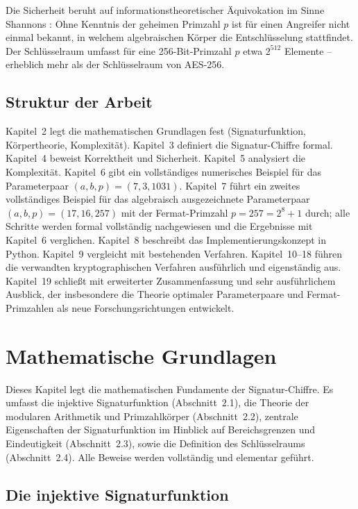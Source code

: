 ﻿\documentclass[a4paper,12pt]{scrreprt}
\theoremstyle{definition}
\begin{document}
Die Sicherheit beruht auf informationstheoretischer Äquivokation im Sinne Shannons \cite{Sha49}: Ohne Kenntnis der geheimen Primzahl $p$ ist für einen Angreifer nicht einmal bekannt, in welchem algebraischen Körper die Entschlüsselung stattfindet. Der Schlüsselraum umfasst für eine 256-Bit-Primzahl $p$ etwa $2^{512}$ Elemente -- erheblich mehr als der Schlüsselraum von AES-256.

\subsection{Struktur der Arbeit}

Kapitel~2 legt die mathematischen Grundlagen fest (Signaturfunktion, Körpertheorie, Komplexität). Kapitel~3 definiert die Signatur-Chiffre formal. Kapitel~4 beweist Korrektheit und Sicherheit. Kapitel~5 analysiert die Komplexität. Kapitel~6 gibt ein vollständiges numerisches Beispiel für das Parameterpaar $(a,b,p)=(7,3,1031)$. Kapitel~7 führt ein zweites vollständiges Beispiel für das algebraisch ausgezeichnete Parameterpaar $(a,b,p)=(17,16,257)$ mit der Fermat-Primzahl $p=257=2^8+1$ durch; alle Schritte werden formal vollständig nachgewiesen und die Ergebnisse mit Kapitel~6 verglichen. Kapitel~8 beschreibt das Implementierungskonzept in Python. Kapitel~9 vergleicht mit bestehenden Verfahren. Kapitel~10--18 führen die verwandten kryptographischen Verfahren ausführlich und eigenständig aus. Kapitel~19 schließt mit erweiterter Zusammenfassung und sehr ausführlichem Ausblick, der insbesondere die Theorie optimaler Parameterpaare und Fermat-Primzahlen als neue Forschungsrichtungen entwickelt.

\section{Mathematische Grundlagen}

Dieses Kapitel legt die mathematischen Fundamente der Signatur-Chiffre. Es umfasst die injektive Signaturfunktion (Abschnitt~2.1), die Theorie der modularen Arithmetik und Primzahlkörper (Abschnitt~2.2), zentrale Eigenschaften der Signaturfunktion im Hinblick auf Bereichsgrenzen und Eindeutigkeit (Abschnitt~2.3), sowie die Definition des Schlüsselraums (Abschnitt~2.4). Alle Beweise werden vollständig und elementar geführt.

\subsection{Die injektive Signaturfunktion}
\end{document}
